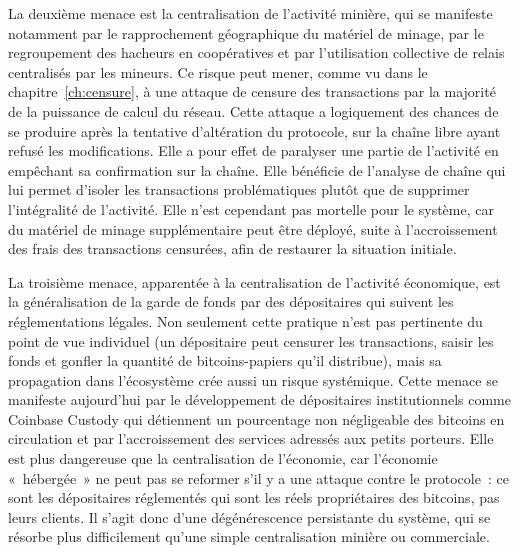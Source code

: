La deuxième menace est la centralisation de l'activité minière, qui se manifeste notamment par le rapprochement géographique du matériel de minage, par le regroupement des hacheurs en coopératives et par l'utilisation collective de relais centralisés par les mineurs. Ce risque peut mener, comme vu dans le chapitre~\ref{ch:censure}, à une attaque de censure des transactions par la majorité de la puissance de calcul du réseau. Cette attaque a logiquement des chances de se produire après la tentative d'altération du protocole, sur la chaîne libre ayant refusé les modifications. Elle a pour effet de paralyser une partie de l'activité en empêchant sa confirmation sur la chaîne. Elle bénéficie de l'analyse de chaîne qui lui permet d'isoler les transactions problématiques plutôt que de supprimer l'intégralité de l'activité. Elle n'est cependant pas mortelle pour le système, car du matériel de minage supplémentaire peut être déployé, suite à l'accroissement des frais des transactions censurées, afin de restaurer la situation initiale. %

La troisième menace, apparentée à la centralisation de l'activité économique, est la généralisation de la garde de fonds par des dépositaires qui suivent les réglementations légales. Non seulement cette pratique n'est pas pertinente du point de vue individuel (un dépositaire peut censurer les transactions, saisir les fonds et gonfler la quantité de bitcoins-papiers qu'il distribue), mais sa propagation dans l'écosystème crée aussi un risque systémique. Cette menace se manifeste aujourd'hui par le développement de dépositaires institutionnels comme Coinbase Custody qui détiennent un pourcentage non négligeable des bitcoins en circulation et par l'accroissement des services adressés aux petits porteurs. Elle est plus dangereuse que la centralisation de l'économie, car l'économie «~hébergée~» ne peut pas se reformer s'il y a une attaque contre le protocole~: ce sont les dépositaires réglementés qui sont les réels propriétaires des bitcoins, pas leurs clients. Il s'agit donc d'une dégénérescence persistante du système, qui se résorbe plus difficilement qu'une simple centralisation minière ou commerciale.

